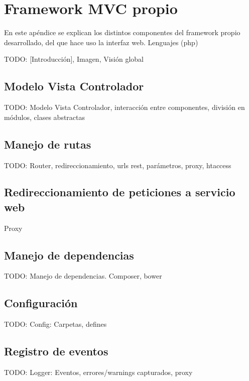 \chapter{Framework MVC propio\label{extra:framework_mvc_propio}}

En este apéndice se explican los distintos componentes del \gls{framework} propio desarrollado, del que hace uso la interfaz web. 
Lenguajes (php)

TODO: [Introducción], Imagen, 
  {Visión global}


\section{Modelo Vista Controlador\label{extra:mvc:mvc}}

TODO: Modelo Vista Controlador, interacción entre componentes, división en módulos,
clases abstractas

\section{Manejo de rutas\label{extra:mvc:router}}

TODO: Router, redireccionamiento, urls rest, parámetros, proxy, htaccess

\section{Redireccionamiento de peticiones a servicio web\label{extra:mvc:proxy}}

Proxy

\section{Manejo de dependencias\label{extra:mvc:dependencias}}

TODO: Manejo de dependencias. Composer, bower

\section{Configuración\label{extra:mvc:config}}

TODO: Config: Carpetas, defines

\section{Registro de eventos\label{extra:mvc:logger}}

TODO: Logger: Eventos, errores/warnings capturados, proxy

